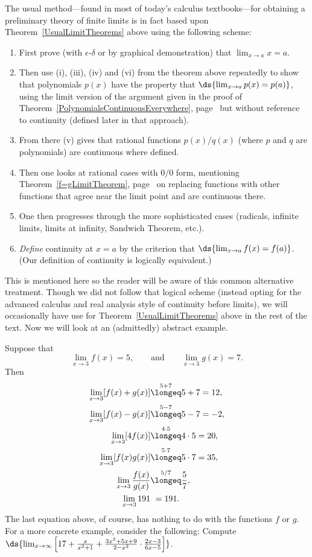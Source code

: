 The usual method---found in most of today's calculus textbooks---for 
obtaining a preliminary theory of finite limits is in fact based upon 
Theorem~\ref{UsualLimitTheorems} above using the following scheme:
\begin{enumerate}
\item First prove (with $\epsilon$-$\delta$
or by graphical demonstration) that 
$\lim_{x\to a}x=a$.
\item Then  use (i), (iii), (iv) and (vi) from the theorem above
repeatedly to show that polynomials $p(x)$ have the property that
$\ds{\lim_{x\to a}p(x)=p(a)}$, using the limit version of
the argument given in the proof of
Theorem~\ref{PolynomialsContinuousEverywhere},
page~\pageref{PolynomialsContinuousEverywhere}
but without reference to continuity (defined later in that approach).
\item From there (v) gives that rational functions $p(x)/q(x)$ (where 
$p$ and $q$ are polynomials) are
continuous where defined.  
\item Then one
looks at rational cases with $0/0$ form,
mentioning Theorem~\ref{f=gLimitTheorem}, page~\pageref{f=gLimitTheorem}
on replacing functions
with other functions that agree near the limit point and are continuous
there.  
\item One then
progresses through the more sophisticated cases
(radicals, infinite limits, limits at infinity,
Sandwich Theorem, etc.).  
\item {\it Define} continuity at $x=a$ by the criterion
that $\ds{\lim_{x\to a}f(x)=f(a)}$. (Our definition of continuity is
logically equivalent.)
\end{enumerate}

This is mentioned here so the reader will be aware of 
this common alternative treatment.  Though we did not follow that
logical scheme (instead opting for the advanced calculus and real analysis
style of continuity before limits), we will 
occasionally have use for Theorem~\ref{UsualLimitTheorems}
above in the rest of the text.  Now we will look at an
(admittedly) abstract example.

\bex Suppose that
$$\lim_{x\to3}f(x)=5,\qquad\text{and}\qquad \lim_{x\to3}g(x)=7.$$
Then
\begin{align*}
\lim_{x\to3}[f(x)+g(x)]&\overset{5+7}{\longeq}5+7=12,\\
\lim_{x\to3}[f(x)-g(x)]&\overset{5-7}{\longeq}5-7=-2,\\
\lim_{x\to3}[4f(x)]&\overset{4\cdot5}{\longeq}4\cdot5=20,\\
\lim_{x\to3}[f(x)g(x)]&\overset{5\cdot7}{\longeq}5\cdot7=35,\\
\lim_{x\to3}\frac{f(x)}{g(x)}&\overset{5/7}{\longeq}\frac57,\\
\lim_{x\to3}191&\ = 191.
\end{align*}
\eex
The last equation above, of course, has nothing to do with the 
functions $f$ or $g$.
For a more concrete example, consider the following:
\bex Compute $\ds{\lim_{x\to\infty}\left[17+
   \frac{x}{x^2+1}+\frac{3x^2+5x+9}{2-x^2}\cdot
             \frac{2x-3}{6x-5}\right]}$.

